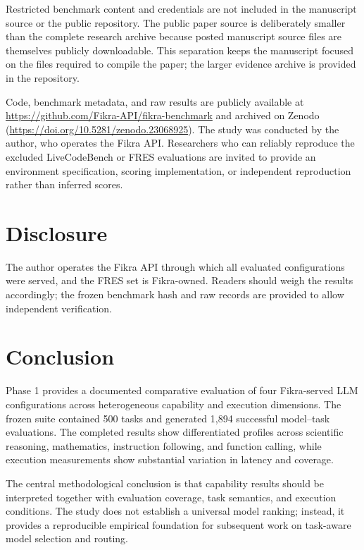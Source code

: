 \documentclass[11pt]{article}
\begin{document}
Restricted benchmark content and credentials are not included in the manuscript source or the public repository. The public paper source is deliberately smaller than the complete research archive because posted manuscript source files are themselves publicly downloadable. This separation keeps the manuscript focused on the files required to compile the paper; the larger evidence archive is provided in the repository.

Code, benchmark metadata, and raw results are publicly available at \url{https://github.com/Fikra-API/fikra-benchmark} and archived on Zenodo (\url{https://doi.org/10.5281/zenodo.23068925}). The study was conducted by the author, who operates the Fikra API. Researchers who can reliably reproduce the excluded LiveCodeBench or FRES evaluations are invited to provide an environment specification, scoring implementation, or independent reproduction rather than inferred scores.

\section*{Disclosure}
The author operates the Fikra API through which all evaluated configurations were served, and the FRES set is Fikra-owned. Readers should weigh the results accordingly; the frozen benchmark hash and raw records are provided to allow independent verification.

\section{Conclusion}
Phase 1 provides a documented comparative evaluation of four Fikra-served LLM configurations across heterogeneous capability and execution dimensions. The frozen suite contained 500 tasks and generated 1,894 successful model--task evaluations. The completed results show differentiated profiles across scientific reasoning, mathematics, instruction following, and function calling, while execution measurements show substantial variation in latency and coverage.

The central methodological conclusion is that capability results should be interpreted together with evaluation coverage, task semantics, and execution conditions. The study does not establish a universal model ranking; instead, it provides a reproducible empirical foundation for subsequent work on task-aware model selection and routing.
\end{document}
